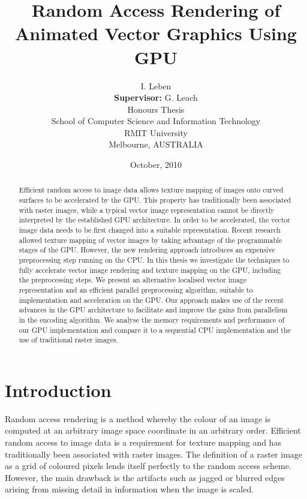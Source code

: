\documentclass[11pt,a4paper,twoside]{article}
\newcommand{\student}{I. Leben}
\newcommand{\topic}{Random Access Rendering of Animated Vector Graphics Using GPU}
\begin{document}
\title{{\sc \topic}}
\author
{
{\sc \student}
\\[3mm] {\bf Supervisor:} {\sc G. Leach}
\\[5mm] Honours Thesis
\\[5mm] School of Computer Science and Information Technology
\\ RMIT University 
\\ Melbourne, AUSTRALIA
}
\date {October, 2010}
\maketitle

\begin{abstract}
Efficient random access to image data allows texture mapping of images onto curved surfaces to be accelerated by the GPU. This property has traditionally been associated with raster images, while a typical vector image representation cannot be directly interpreted by the established GPU architecture. In order to be accelerated, the vector image data needs to be first changed into a suitable representation. Recent research allowed texture mapping of vector images by taking advantage of the programmable stages of the GPU. However, the new rendering approach introduces an expensive preprocessing step running on the CPU. In this thesis we investigate the techniques to fully accelerate vector image rendering and texture mapping on the GPU, including the preprocessing steps. We present an alternative localised vector image representation and an efficient parallel preprocessing algorithm, suitable to implementation and acceleration on the GPU. Our approach makes use of the recent advances in the GPU architecture to facilitate and improve the gains from parallelism in the encoding algorithm. We analyse the memory requirements and performance of our GPU implementation and compare it to a sequential CPU implementation and the use of traditional raster images.
\end{abstract}

\newpage
\tableofcontents
\newpage

\pagestyle{fancy}

\section{Introduction}

Random access rendering is a method whereby the colour of an image is computed at an arbitrary image space coordinate in an arbitrary order. Efficient random access to image data is a requirement for texture mapping and has traditionally been associated with raster images. The definition of a raster image as a grid of coloured pixels lends itself perfectly to the random access scheme. However, the main drawback is the artifacts such as jagged or blurred edges arising from missing detail in information when the image is scaled.
\end{document}
